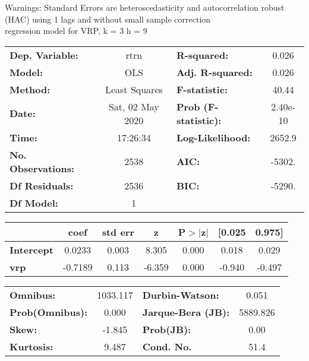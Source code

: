 Warnings: \newline
 [1] Standard Errors are heteroscedasticity and autocorrelation robust (HAC) using 1 lags and without small sample correction\\ 

regression model for VRP, k = 3 h = 9\begin{center}
\begin{tabular}{lclc}
\toprule
\textbf{Dep. Variable:}    &       rtrn       & \textbf{  R-squared:         } &     0.026   \\
\textbf{Model:}            &       OLS        & \textbf{  Adj. R-squared:    } &     0.026   \\
\textbf{Method:}           &  Least Squares   & \textbf{  F-statistic:       } &     40.44   \\
\textbf{Date:}             & Sat, 02 May 2020 & \textbf{  Prob (F-statistic):} &  2.40e-10   \\
\textbf{Time:}             &     17:26:34     & \textbf{  Log-Likelihood:    } &    2652.9   \\
\textbf{No. Observations:} &        2538      & \textbf{  AIC:               } &    -5302.   \\
\textbf{Df Residuals:}     &        2536      & \textbf{  BIC:               } &    -5290.   \\
\textbf{Df Model:}         &           1      & \textbf{                     } &             \\
\bottomrule
\end{tabular}
\begin{tabular}{lcccccc}
                   & \textbf{coef} & \textbf{std err} & \textbf{z} & \textbf{P$> |$z$|$} & \textbf{[0.025} & \textbf{0.975]}  \\
\midrule
\textbf{Intercept} &       0.0233  &        0.003     &     8.305  &         0.000        &        0.018    &        0.029     \\
\textbf{vrp}       &      -0.7189  &        0.113     &    -6.359  &         0.000        &       -0.940    &       -0.497     \\
\bottomrule
\end{tabular}
\begin{tabular}{lclc}
\textbf{Omnibus:}       & 1033.117 & \textbf{  Durbin-Watson:     } &    0.051  \\
\textbf{Prob(Omnibus):} &   0.000  & \textbf{  Jarque-Bera (JB):  } & 5889.826  \\
\textbf{Skew:}          &  -1.845  & \textbf{  Prob(JB):          } &     0.00  \\
\textbf{Kurtosis:}      &   9.487  & \textbf{  Cond. No.          } &     51.4  \\
\bottomrule
\end{tabular}
\end{center}

